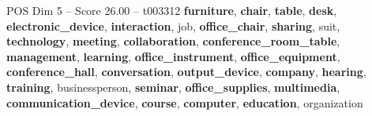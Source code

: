 \begin{textsample}{POS Dim 5 – Score 26.00 – t003312}  \label{ex:f5_pos_033}
\textbf{furniture}, \textbf{chair}, \textbf{table}, \textbf{desk}, \textbf{electronic\_device}, \textbf{interaction}, job, \textbf{office\_chair}, \textbf{sharing}, suit, \textbf{technology}, \textbf{meeting}, \textbf{collaboration}, \textbf{conference\_room\_table}, \textbf{management}, \textbf{learning}, \textbf{office\_instrument}, \textbf{office\_equipment}, \textbf{conference\_hall}, \textbf{conversation}, \textbf{output\_device}, \textbf{company}, \textbf{hearing}, \textbf{training}, businessperson, \textbf{seminar}, \textbf{office\_supplies}, \textbf{multimedia}, \textbf{communication\_device}, \textbf{course}, \textbf{computer}, \textbf{education}, organization

\end{textsample}
